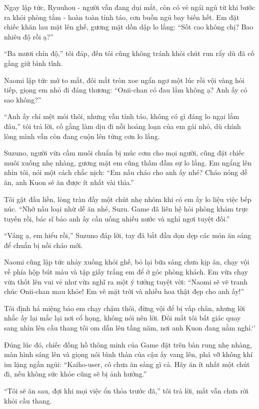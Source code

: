 \documentclass[../main.tex]{subfiles}
\begin{document}
Ngay lập tức, Ryuuhou - người vẫn đang dụi mắt, còn có vẻ ngái ngủ từ khi bước ra khỏi phòng tắm - hoàn toàn tỉnh táo, cơn buồn ngủ bay biến hết. Em đặt chiếc khăn lau mặt lên ghế, gương mặt dồn dập lo lắng: ``Sốt cao không chị? Bao nhiêu độ rồi ạ?''

``Ba mươi chín độ,'' tôi đáp, đến tôi cũng không tránh khỏi chút run rẩy dù đã cố gắng giữ bình tĩnh.

Naomi lập tức mở to mắt, đôi mắt tròn xoe ngẩn ngơ một lúc rồi vội vàng hỏi tiếp, giọng em nhỏ đi đáng thương: ``Onii-chan có đau lắm không ạ? Anh ấy có sao không?''

``Anh ấy chỉ mệt mỏi thôi, nhưng vẫn tỉnh táo, không có gì đáng lo ngại lắm đâu,'' tôi trả lời, cố gắng làm dịu đi nỗi hoảng loạn của em gái nhỏ, dù chính lòng mình vẫn còn đang cuộn lên từng cơn lo lắng.

Suzuno, người vừa cầm muôi chuẩn bị múc cơm cho mọi người, cũng đặt chiếc muôi xuống nhẹ nhàng, gương mặt em cũng thấm đẫm sự lo lắng. Em ngẩng lên nhìn tôi, nói một cách chắc nịch: ``Em nấu cháo cho anh ấy nhé? Cháo nóng dễ ăn, anh Kuon sẽ ăn được ít nhất vài thìa.''

Tôi gật đầu liền, lòng tràn đầy một chút nhẹ nhõm khi có em ấy lo liệu việc bếp núc. ``Nhớ nấu loại nhừ dễ ăn nhé, Suzu. Game đã liên hệ hỏi phòng khám trực tuyến rồi, bác sĩ bảo anh ấy cần uống nhiều nước và nghỉ ngơi tuyệt đối.''

``Vâng ạ, em hiểu rồi,'' Suzuno đáp lời, tay đã bắt đầu dọn dẹp các món ăn sáng để chuẩn bị nồi cháo mới.

Naomi cũng lập tức nhảy xuống khỏi ghế, bỏ lại bữa sáng chưa kịp ăn, chạy vội về phía hộp bút màu và tập giấy trắng em để ở góc phòng khách. Em vừa chạy vừa thốt lên vui vẻ như vừa nghĩ ra một ý tưởng tuyệt vời: ``Naomi sẽ vẽ tranh chúc Onii-chan mau khỏe! Em vẽ mặt trời và nhiều hoa thật đẹp cho anh ấy!''

Tôi định há miệng bảo em chạy chậm thôi, đừng vội để bị vấp chân, nhưng lời nhắc ấy lại mắc lại nơi cổ họng, không nói nên lời. Đôi mắt tôi bất giác quay sang nhìn lên cầu thang tối om dẫn lên tầng năm, nơi anh Kuon đang nằm nghỉ.`'

Đúng lúc đó, chiếc đồng hồ thông minh của Game đặt trên bàn rung nhẹ nhàng, màn hình sáng lên và giọng nói bình thản của cậu ấy vang lên, phá vỡ không khí im lặng ngắn ngủi: ``Kaiho-user, cô chưa ăn sáng gì cả. Hãy ăn ít nhất một chút đi, nếu không sức khỏe cũng sẽ bị ảnh hưởng.''

``Tôi sẽ ăn sau, đợi khi mọi việc ổn thỏa trước đã,'' tôi trả lời, mắt vẫn chưa rời khỏi cầu thang.
\end{document}

